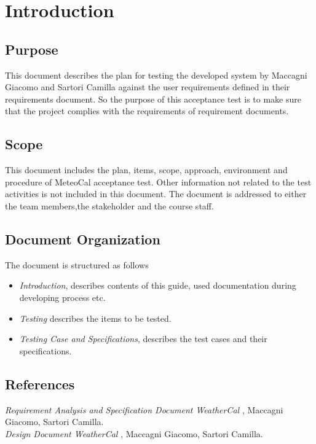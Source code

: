 \chapter{Introduction} \label{cap:cap1}
\section{Purpose}
This document describes the plan for testing the developed system by Maccagni Giacomo and Sartori Camilla against the user requirements defined in their requirements document. So the purpose of this acceptance test is to make sure that the project complies with the requirements of requirement documents.
\section{Scope}
This document includes the plan, items, scope, approach, environment and procedure of MeteoCal acceptance test. Other information not related to the test activities is not included in this document.
The document is addressed to either the team members,the  stakeholder and the course staff.
\section{Document Organization}
The document is structured as follows 
\begin{itemize}
\item {\it Introduction}, describes contents of this guide, used documentation during developing process etc.
\item {\it Testing} describes the items to be tested.
\item {\it Testing Case and Specifications}, describes the test cases and their specifications.
\end{itemize}
\section{References}
{\it Requirement Analysis and Specification Document WeatherCal },  Maccagni Giacomo, Sartori Camilla.\\
{\it Design Document WeatherCal },  Maccagni Giacomo, Sartori Camilla.

 
 
 
 
 
 